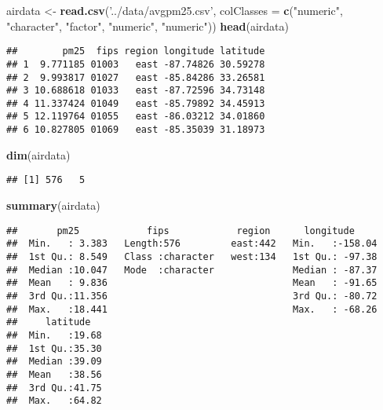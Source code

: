 \documentclass[]{article}
\newenvironment{Shaded}{\begin{snugshade}}{\end{snugshade}}
\newcommand{\KeywordTok}[1]{\textcolor[rgb]{0.13,0.29,0.53}{\textbf{#1}}}
\newcommand{\DataTypeTok}[1]{\textcolor[rgb]{0.13,0.29,0.53}{#1}}
\newcommand{\StringTok}[1]{\textcolor[rgb]{0.31,0.60,0.02}{#1}}
\newcommand{\NormalTok}[1]{#1}
\begin{document}
\begin{Shaded}
\begin{Highlighting}[]
\NormalTok{airdata <-}\StringTok{ }\KeywordTok{read.csv}\NormalTok{(}\StringTok{'../data/avgpm25.csv'}\NormalTok{, }\DataTypeTok{colClasses =} \KeywordTok{c}\NormalTok{(}\StringTok{"numeric"}\NormalTok{, }\StringTok{"character"}\NormalTok{, }\StringTok{"factor"}\NormalTok{, }\StringTok{"numeric"}\NormalTok{, }\StringTok{"numeric"}\NormalTok{))}
\KeywordTok{head}\NormalTok{(airdata)}
\end{Highlighting}
\end{Shaded}

\begin{verbatim}
##        pm25  fips region longitude latitude
## 1  9.771185 01003   east -87.74826 30.59278
## 2  9.993817 01027   east -85.84286 33.26581
## 3 10.688618 01033   east -87.72596 34.73148
## 4 11.337424 01049   east -85.79892 34.45913
## 5 12.119764 01055   east -86.03212 34.01860
## 6 10.827805 01069   east -85.35039 31.18973
\end{verbatim}

\begin{Shaded}
\begin{Highlighting}[]
\KeywordTok{dim}\NormalTok{(airdata)}
\end{Highlighting}
\end{Shaded}

\begin{verbatim}
## [1] 576   5
\end{verbatim}

\begin{Shaded}
\begin{Highlighting}[]
\KeywordTok{summary}\NormalTok{(airdata)}
\end{Highlighting}
\end{Shaded}

\begin{verbatim}
##       pm25            fips            region      longitude      
##  Min.   : 3.383   Length:576         east:442   Min.   :-158.04  
##  1st Qu.: 8.549   Class :character   west:134   1st Qu.: -97.38  
##  Median :10.047   Mode  :character              Median : -87.37  
##  Mean   : 9.836                                 Mean   : -91.65  
##  3rd Qu.:11.356                                 3rd Qu.: -80.72  
##  Max.   :18.441                                 Max.   : -68.26  
##     latitude    
##  Min.   :19.68  
##  1st Qu.:35.30  
##  Median :39.09  
##  Mean   :38.56  
##  3rd Qu.:41.75  
##  Max.   :64.82
\end{verbatim}
\end{document}
